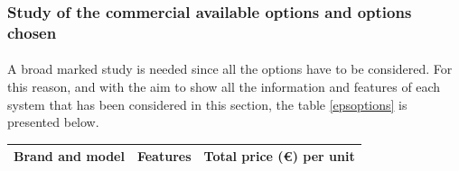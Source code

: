 \subsubsection{Study of the commercial available options and options chosen}
\paragraph{}A broad marked study is needed since all the options have to be considered. For this reason, and with the aim to show all the information and features of each system that has been considered in this section, the table \ref{epsoptions} is presented below.

\begin{longtable}{| l | c | c | }
\hline
\rowcolor[gray]{0.80}	\textbf{Brand and model} &  \textbf{Features}     & \textbf{Total price (\euro) per unit}   \\
\hline
\endfirsthead


\end{longtable}
